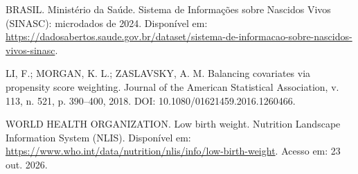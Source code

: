 \documentclass[10pt,a4paper]{article}
\begin{document}
\par{}\par\vspace{2pt}
{\footnotesize BRASIL. Ministério da Saúde. Sistema de Informações sobre Nascidos Vivos (SINASC): microdados de 2024. Disponível em: \url{https://dadosabertos.saude.gov.br/dataset/sistema-de-informacao-sobre-nascidos-vivos-sinasc}.\par}\vspace{2pt}
{\footnotesize LI, F.; MORGAN, K. L.; ZASLAVSKY, A. M. Balancing covariates via propensity score weighting. Journal of the American Statistical Association, v. 113, n. 521, p. 390--400, 2018. DOI: 10.1080/01621459.2016.1260466.\par}\vspace{2pt}
{\footnotesize WORLD HEALTH ORGANIZATION. Low birth weight. Nutrition Landscape Information System (NLIS). Disponível em: \url{https://www.who.int/data/nutrition/nlis/info/low-birth-weight}. Acesso em: 23 out. 2026.\par}\vspace{2pt}
\end{document}
